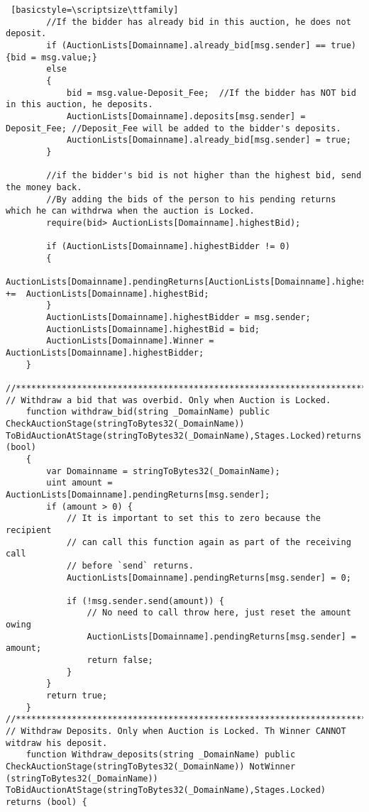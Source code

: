 \begin{lstlisting} [basicstyle=\scriptsize\ttfamily]
        //If the bidder has already bid in this auction, he does not deposit.
        if (AuctionLists[Domainname].already_bid[msg.sender] == true) {bid = msg.value;}
        else
        {
            bid = msg.value-Deposit_Fee;  //If the bidder has NOT bid in this auction, he deposits.
            AuctionLists[Domainname].deposits[msg.sender] = Deposit_Fee; //Deposit_Fee will be added to the bidder's deposits.
            AuctionLists[Domainname].already_bid[msg.sender] = true;
        }

        //if the bidder's bid is not higher than the highest bid, send the money back.
        //By adding the bids of the person to his pending returns which he can withdrwa when the auction is Locked.
        require(bid> AuctionLists[Domainname].highestBid);

        if (AuctionLists[Domainname].highestBidder != 0)
        {
            AuctionLists[Domainname].pendingReturns[AuctionLists[Domainname].highestBidder] +=  AuctionLists[Domainname].highestBid;
        }
        AuctionLists[Domainname].highestBidder = msg.sender;
        AuctionLists[Domainname].highestBid = bid;
        AuctionLists[Domainname].Winner =  AuctionLists[Domainname].highestBidder;
    }

//********************************************************************************************************************
// Withdraw a bid that was overbid. Only when Auction is Locked.
    function withdraw_bid(string _DomainName) public  CheckAuctionStage(stringToBytes32(_DomainName)) ToBidAuctionAtStage(stringToBytes32(_DomainName),Stages.Locked)returns (bool)
    {
        var Domainname = stringToBytes32(_DomainName);
        uint amount = AuctionLists[Domainname].pendingReturns[msg.sender];
        if (amount > 0) {
            // It is important to set this to zero because the recipient
            // can call this function again as part of the receiving call
            // before `send` returns.
            AuctionLists[Domainname].pendingReturns[msg.sender] = 0;

            if (!msg.sender.send(amount)) {
                // No need to call throw here, just reset the amount owing
                AuctionLists[Domainname].pendingReturns[msg.sender] = amount;
                return false;
            }
        }
        return true;
    }
//********************************************************************************************************************
// Withdraw Deposits. Only when Auction is Locked. Th Winner CANNOT witdraw his deposit.
    function Withdraw_deposits(string _DomainName) public CheckAuctionStage(stringToBytes32(_DomainName)) NotWinner (stringToBytes32(_DomainName)) ToBidAuctionAtStage(stringToBytes32(_DomainName),Stages.Locked) returns (bool) {


\end{lstlisting}
